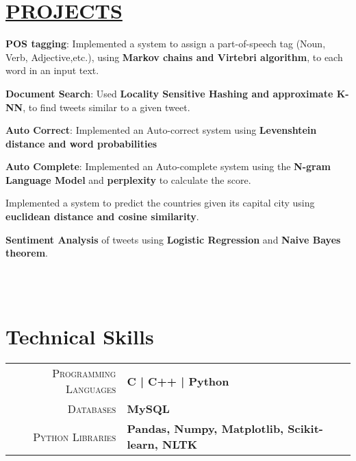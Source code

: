 \documentclass[]{deedy-resume-openfont}
\begin{document}
\hfill
\begin{minipage}[t]{0.66\textwidth} 



\section{\href{https://github.com/SPOOKBITE/NLP_PROJECTS}{PROJECTS}}

\vspace{\topsep} %
\begin{tightemize}
\item \textbf{POS tagging}: Implemented a system to assign a part-of-speech tag (Noun, Verb, Adjective,etc.), using \textbf{Markov chains and Virtebri algorithm}, to each word in an input text.
\item \textbf{Document Search}: Used \textbf{Locality Sensitive Hashing and approximate K-NN}, to find tweets similar to a given tweet.
\item \textbf{Auto Correct}: Implemented an Auto-correct system using \textbf{Levenshtein distance and word probabilities}
\item \textbf{Auto Complete}: Implemented an Auto-complete system using the \textbf{N-gram Language Model} and \textbf{perplexity} to calculate the score.
\item Implemented a system to predict the countries given its capital city using \textbf{euclidean distance and cosine similarity}.
\item \textbf{Sentiment Analysis} of tweets using \textbf{Logistic Regression} and \textbf{Naive Bayes theorem}.
\end{tightemize}


\\~\\



\section{Technical Skills}
\begin{tabular}{r|p{15cm}}
\textsc{Programming Languages} & \textbf{ C | C++ | Python } \\
\textsc{Databases} & \textbf{ MySQL }\\
\textsc{Python Libraries} & \textbf{Pandas, Numpy, Matplotlib, Scikit-learn, NLTK}\\ 
\end{tabular}


\end{minipage}
\end{document}

